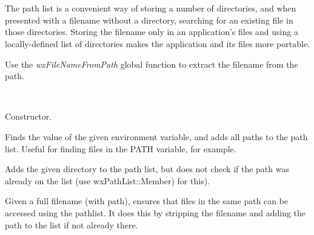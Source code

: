 \section{}\label{wxpathlist}

The path list is a convenient way of storing a number of directories, and
when presented with a filename without a directory, searching for an existing file
in those directories.  Storing the filename only in an application's files and
using a locally-defined list of directories makes the application and its files more
portable.

Use the {\it wxFileNameFromPath} global function to extract the filename
from the path.


\\






Constructor.



Finds the value of the given environment variable, and adds all paths
to the path list. Useful for finding files in the PATH variable, for
example.



Adds the given directory to the path list, but does not
check if the path was already on the list (use wxPathList::Member)
for this).



Given a full filename (with path), ensures that files in the same path
can be accessed using the pathlist. It does this by stripping the
filename and adding the path to the list if not already there.


